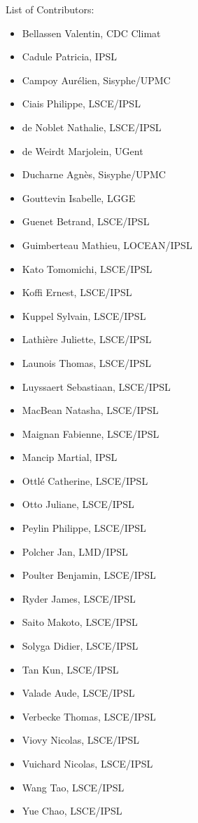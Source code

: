 List of Contributors:
\begin{itemize}
\item Bellassen Valentin, CDC Climat
\item Cadule Patricia, IPSL
\item Campoy Aurélien, Sisyphe/UPMC
\item Ciais Philippe, LSCE/IPSL
\item de Noblet Nathalie, LSCE/IPSL
\item de Weirdt Marjolein, UGent
\item Ducharne Agnès, Sisyphe/UPMC
\item Gouttevin Isabelle, LGGE
\item Guenet Betrand, LSCE/IPSL
\item Guimberteau Mathieu, LOCEAN/IPSL
\item Kato Tomomichi, LSCE/IPSL
\item Koffi Ernest, LSCE/IPSL
\item Kuppel Sylvain, LSCE/IPSL
\item Lathière Juliette, LSCE/IPSL
\item Launois Thomas, LSCE/IPSL
\item Luyssaert Sebastiaan, LSCE/IPSL
\item MacBean Natasha, LSCE/IPSL
\item Maignan Fabienne, LSCE/IPSL
\item Mancip Martial, IPSL
\item Ottlé Catherine, LSCE/IPSL
\item Otto Juliane, LSCE/IPSL
\item Peylin Philippe, LSCE/IPSL
\item Polcher Jan, LMD/IPSL
\item Poulter Benjamin, LSCE/IPSL
\item Ryder James, LSCE/IPSL
\item Saito Makoto, LSCE/IPSL
\item Solyga Didier, LSCE/IPSL
\item Tan Kun, LSCE/IPSL
\item Valade Aude, LSCE/IPSL
\item Verbecke Thomas, LSCE/IPSL
\item Viovy Nicolas, LSCE/IPSL
\item Vuichard Nicolas, LSCE/IPSL
\item Wang Tao, LSCE/IPSL
\item Yue Chao, LSCE/IPSL
\end{itemize}




